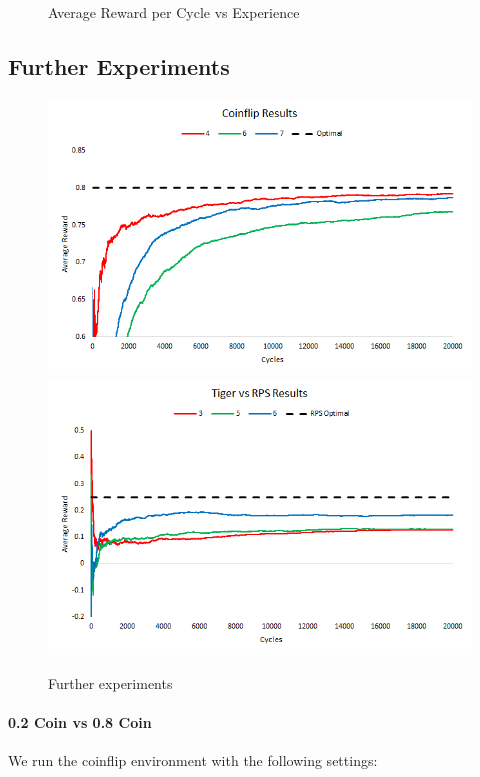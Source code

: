 \documentclass[paper=a4, fontsize=11pt]{scrartcl} %
\numberwithin{equation}{section} %
\numberwithin{figure}{section} %
\numberwithin{table}{section} %
\begin{document}
\begin{figure}
\caption{\label{plot:rewards}Average Reward per Cycle vs Experience}
\end{figure}

\setlength\parindent{0pt}

\subsection{Further Experiments}

\begin{figure}
\includegraphics[width=\textwidth]{plots/coinflip_tests1}
\includegraphics[width=\textwidth]{plots/rps_tiger_1}
\caption{\label{plot:cointests}Further experiments}
\end{figure}

\paragraph{0.2 Coin vs 0.8 Coin}
We run the coinflip environment with the following settings:
\end{document}

